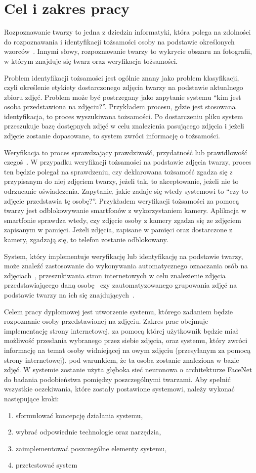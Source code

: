 \chapter{Cel i zakres pracy}

Rozpoznawanie twarzy to jedna z dziedzin informatyki, która polega na zdolności
do rozpoznawania i identyfikacji tożsamości osoby na podstawie określonych wzorców~\cite{william2019face}.
Innymi słowy, rozpoznawanie twarzy to wykrycie obszaru na fotografii,
w którym znajduje się twarz oraz weryfikacja tożsamości.

Problem identyfikacji tożsamości jest ogólnie znany jako problem klasyfikacji,
czyli określenie etykiety dostarczonego zdjęcia twarzy na podstawie aktualnego zbioru zdjęć.
Problem może być postrzegany jako zapytanie systemu ``kim jest osoba przedstawiona na zdjęciu?''.
Przykładem procesu, gdzie jest stosowana identyfikacja, to proces wyszukiwana tożsamości.
Po dostarczeniu pliku system przeszukuje bazę dostępnych zdjęć w celu znalezienia pasującego zdjęcia
i jeżeli zdjęcie zostanie dopasowane, to system zwróci informację o tożsamości.

Weryfikacja to proces sprawdzający prawdziwość, przydatność lub prawidłowość czegoś~\cite{sjp_pwn_1996}.
W przypadku weryfikacji tożsamości na podstawie zdjęcia twarzy, proces ten będzie polegał na sprawdzeniu,
czy deklarowana tożsamość zgadza się z przypisanym do niej zdjęciem twarzy, jeżeli tak,
to akceptowanie, jeżeli nie to odrzucanie oświadczenia.
Zapytanie, jakie zadaje się wtedy systemowi to ``czy to zdjęcie przedstawia tę osobę?''.
Przykładem weryfikacji tożsamości za pomocą twarzy jest odblokowywanie smartfonów z wykorzystaniem kamery.
Aplikacja w smartfonie sprawdza wtedy, czy zdjęcie osoby z kamery zgadza się ze zdjęciem zapisanym w pamięci.
Jeżeli zdjęcia, zapisane w pamięci oraz dostarczone z kamery, zgadzają się, to telefon zostanie odblokowany.

System, który implementuje weryfikację lub identyfikację na podstawie twarzy,
może znaleźć zastosowanie do wykonywania automatycznego oznaczania osób na zdjęciach~\cite{facebook-aut-tag},
przeszukiwania stron internetowych w celu znalezienie zdjęcia przedstawiającego daną osobę~\cite{pimeyes}
czy zautomatyzowanego grupowania zdjęć na podstawie twarzy na ich się znajdujących~\cite{google-photos_groupby}.

Celem pracy dyplomowej jest utworzenie systemu, którego zadaniem będzie rozpoznanie osoby przedstawionej na zdjęciu.
Zakres prac obejmuje implementację strony internetowej,
za pomocą której użytkownik będzie miał możliwość przesłania wybranego przez siebie zdjęcia,
oraz systemu, który zwróci informację na temat osoby widniejącej na owym zdjęciu
(przesyłanym za pomocą strony internetowej),
pod warunkiem, że ta osoba zostanie znaleziona w bazie zdjęć.
W systemie zostanie użyta głęboka sieć neuronowa o architekturze FaceNet do badania
podobieństwa pomiędzy poszczególnymi twarzami.
Aby spełnić wszystkie oczekiwania, które zostały postawione systemowi, należy wykonać następujące kroki:

\begin{enumerate}
    \item sformułować koncepcję działania systemu,
    \item wybrać odpowiednie technologie oraz narzędzia,
    \item zaimplementować poszczególne elementy systemu,
    \item przetestować system
\end{enumerate}
